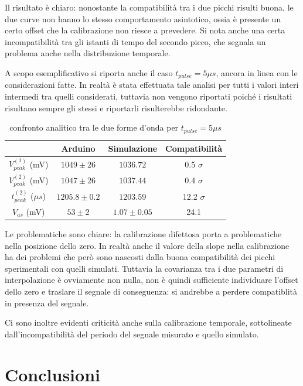 \documentclass{article}
\begin{document}
Il risultato è chiaro: nonostante la compatibilità tra i due picchi risulti buona, le due curve non hanno lo stesso comportamento asintotico, ossia è presente
un certo offset che la calibrazione non riesce a prevedere. Si nota anche una certa incompatibilità tra gli istanti di tempo del secondo picco, che segnala 
un problema anche nella distribuzione temporale.


A scopo esemplificativo si riporta anche il caso $t_{pulse}=5 \mu s$, ancora in linea con le considerazioni fatte. In realtà è stata effettuata tale analisi per tutti 
i valori interi intermedi tra quelli considerati, tuttavia non vengono riportati poiché i risultati risultano sempre gli stessi e riportarli risulterebbe ridondante.

\begin{table}[H]
    \centering
    \begin{tabular}{cccc}
        \toprule
                        & Arduino & Simulazione & Compatibilità \\
        \midrule
        $V_{peak}^{(1)}$ (mV)&   $1049 \pm 26$ & $1036.72$ & 0.5 $\sigma$\\
        $V_{peak}^{(2)}$ (mV)&   $1047 \pm 26$ & $1037.44$ & 0.4 $\sigma$\\
        $t_{peak}^{(2)}$ ($\mu s$)&   $1205.8 \pm 0.2$ & $1203.59$ & 12.2 $\sigma$\\
        $V_{as}$       (mV)&   $53 \pm 2$ & $1.07 \pm 0.05$ & 24.1 \\
        \bottomrule
    \end{tabular}
    \caption{confronto analitico tra le due forme d'onda per $t_{pulse}=5 \mu s$}
\end{table}

Le problematiche sono chiare: la calibrazione difettosa porta a problematiche nella posizione dello zero.
In realtà anche il valore della slope nella calibrazione ha dei problemi che però sono nascosti dalla buona compatibilità 
dei picchi sperimentali con quelli simulati. Tuttavia la covarianza tra i due parametri di interpolazione è ovviamente non nulla,
non è quindi sufficiente individuare l'offset dello zero e traslare il segnale di conseguenza: si andrebbe a perdere compatiblità in presenza
del segnale. 

Ci sono inoltre evidenti criticità anche sulla calibrazione temporale, sottolineate dall'incompatibilità del periodo del segnale misurato e quello 
simulato.


\section{Conclusioni}
\end{document}
